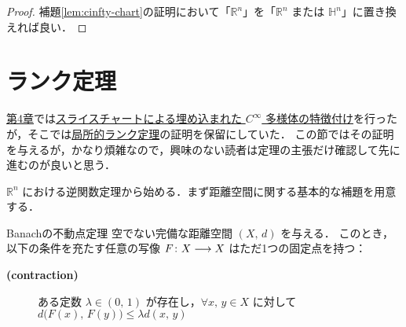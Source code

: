 \documentclass[geometry_main]{subfiles}
\begin{document}
\begin{proof}
    補題\ref{lem:cinfty-chart}の証明において「$\mathbb{R}^n$」を「$\mathbb{R}^n$ または $\mathbb{H}^n$」に置き換えれば良い．
\end{proof}


\section{ランク定理}

\hyperref[chap4]{第4章}では\hyperref[thm:slice-shart-embedded]{スライスチャートによる埋め込まれた $C^\infty$ 多様体の特徴付け}を行ったが，そこでは\hyperref[thm:rank]{局所的ランク定理}の証明を保留にしていた．
この節ではその証明を与えるが，かなり煩雑なので，興味のない読者は定理の主張だけ確認して先に進むのが良いと思う．

$\mathbb{R}^n$ における逆関数定理から始める．まず距離空間に関する基本的な補題を用意する．

\begin{mylem}[label=lem:contraction]{Banachの不動点定理}
    空でない完備な距離空間 $(X,\, d)$ を与える．
    このとき，以下の条件を充たす任意の写像 $F \colon X \longrightarrow X$ はただ1つの固定点を持つ：
    \begin{description}
        \item[\textbf{(contraction)}]  
        ある定数 $\lambda \in (0,\, 1)$ が存在し，$\forall x,\, y \in X$ に対して $d \bigl( F(x),\, F(y) \bigr) \le \lambda d(x,\, y)$
    \end{description}
\end{mylem}
\end{document}
